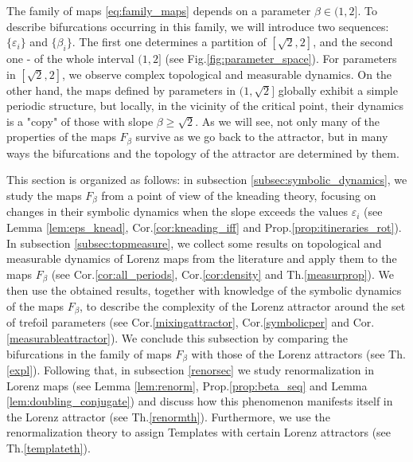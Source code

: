 \documentclass[10pt,reqno]{amsart}
\theoremstyle{plain}
\theoremstyle{assumption}
\theoremstyle{notation}
\theoremstyle{claim}
\theoremstyle{conj}
\theoremstyle{theorem}
\theoremstyle{proposition}
\theoremstyle{corollary}
\begin{document}
The family of maps \eqref{eq:family_maps} depends on a parameter $\beta\in(1,2]$. To describe bifurcations occurring in this family, we will introduce two sequences: $\{\varepsilon_i\}$ and $\{\beta_i\}$. The first one determines a partition of $[\sqrt{2},2]$, and the second one - of the whole interval $(1,2]$ (see Fig.\ref{fig:parameter_space}). For parameters in $[\sqrt{2},2]$, we observe complex topological and measurable dynamics. On the other hand, the maps defined by parameters in $(1,\sqrt{2}]$ globally exhibit a simple periodic structure, but locally, in the vicinity of the critical point, their dynamics is a "copy" of those with slope $\beta\geq\sqrt{2}$. As we will see, not only many of the properties of the maps $F_{\beta}$ survive as we go back to the attractor, but in many ways the bifurcations and the topology of the attractor are determined by them. 

This section is organized as follows: in subsection \ref{subsec:symbolic_dynamics}, we study the maps $F_{\beta}$ from a point of view of the kneading theory, focusing on changes in their symbolic dynamics when the slope exceeds the values $\varepsilon_i$ (see Lemma \ref{lem:eps_knead}, Cor.\ref{cor:kneading_iff} and Prop.\ref{prop:itineraries_rot}). In subsection \ref{subsec:topmeasure}, we collect some results on topological and measurable dynamics of Lorenz maps from the literature and apply them to the maps $F_{\beta}$ (see Cor.\ref{cor:all_periods}, Cor.\ref{cor:density} and Th.\ref{measurprop}). We then use the obtained results, together with knowledge of the symbolic dynamics of the maps $F_{\beta}$, to describe the complexity of the Lorenz attractor around the set of trefoil parameters (see Cor.\ref{mixingattractor}, Cor.\ref{symbolicper} and Cor.\ref{measurableattractor}). We conclude this subsection by comparing the bifurcations in the family of maps $F_{\beta}$ with those of the Lorenz attractors (see Th.\ref{expl}). Following that, in subsection \ref{renorsec} we study renormalization in Lorenz maps (see Lemma \ref{lem:renorm}, Prop.\ref{prop:beta_seq} and Lemma \ref{lem:doubling_conjugate}) and discuss how this phenomenon manifests itself in the Lorenz attractor (see Th.\ref{renormth}). Furthermore, we use the renormalization theory to assign Templates with certain Lorenz attractors (see Th.\ref{templateth}). 
\end{document}
